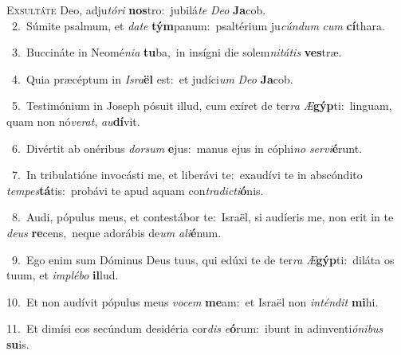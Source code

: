 \lettrine{\initial\textcolor{\initialcolor}{E}}{xsultáte} Deo, adju\-\textit{tó}\-\textit{ri} \textbf{nos}\-tro:~\star jubilá\textit{te} \textit{De}\-\textit{o} \textbf{Ja}\-cob.\\
{\numbfont\textcolor{\numbcolor}{~2.}}~Súmite psalmum, et \textit{da}\-\textit{te} \textbf{tým}\-panum:~\star psaltérium ju\-\textit{cún}\-\textit{dum} \textit{cum} \textbf{cí}\-thara.\par
{\numbfont\textcolor{\numbcolor}{~3.}}~Buccináte in Neomé\-\textit{ni}\-\textit{a} \textbf{tu}\-ba,~\star in insígni die solem\-\textit{ni}\-\textit{tá}\textit{tis} \textbf{ves}\-træ.\par
{\numbfont\textcolor{\numbcolor}{~4.}}~Quia præcéptum in \textit{Is}\-\textit{ra}\textbf{ël} est:~\star et judíci\textit{um} \textit{De}\-\textit{o} \textbf{Ja}\-cob.\par
{\numbfont\textcolor{\numbcolor}{~5.}}~Testimónium in Joseph pósuit illud, cum exíret de ter\textit{ra} \textit{Æ}\-\textbf{gýp}ti:~\star linguam, quam non nó\-\textit{ve}\-\textit{rat}, \textit{au}\-\textbf{dí}vit.\par
{\numbfont\textcolor{\numbcolor}{~6.}}~Divértit ab onéribus \textit{dor}\-\textit{sum} \textbf{e}\-jus:~\star manus ejus in cóphi\textit{no} \textit{ser}\-\textit{vi}\textbf{é}runt.\par
{\numbfont\textcolor{\numbcolor}{~7.}}~In tribulatióne invocásti me, et liberávi te:~\dagger exaudívi te in abscóndito \textit{tem}\-\textit{pes}\textbf{tá}tis:~\star probávi te apud aquam con\-\textit{tra}\-\textit{dic}\textit{ti}\textbf{ó}nis.\par
{\numbfont\textcolor{\numbcolor}{~8.}}~Audi, pópulus meus, et contestábor te:~\dagger Israël, si audíeris me, non erit in te \textit{de}\-\textit{us} \textbf{re}\-cens,~\star neque adorábis de\textit{um} \textit{a}\-\textit{li}\textbf{é}num.\par
{\numbfont\textcolor{\numbcolor}{~9.}}~Ego enim sum Dóminus Deus tuus, qui edúxi te de ter\textit{ra} \textit{Æ}\-\textbf{gýp}ti:~\star diláta os tuum, et \textit{im}\-\textit{plé}\textit{bo} \textbf{il}\-lud.\par
{\numbfont\textcolor{\numbcolor}{10.}}~Et non audívit pópulus meus \textit{vo}\-\textit{cem} \textbf{me}\-am:~\star et Israël non \textit{in}\-\textit{tén}\textit{dit} \textbf{mi}\-hi.\par
{\numbfont\textcolor{\numbcolor}{11.}}~Et dimísi eos secúndum desidéria cor\textit{dis} \textit{e}\-\textbf{ó}rum:~\star ibunt in adinventi\-\textit{ó}\-\textit{ni}\textit{bus} \textbf{su}\-is.\par
